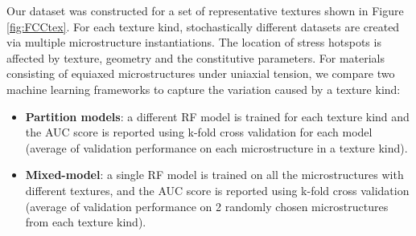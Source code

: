 \documentclass[preprint,1p,times,authoryear]{elsarticle}%
\begin{document}
Our dataset was constructed for a set of representative textures shown in Figure \ref{fig:FCCtex}. For each texture kind, stochastically different datasets are created via multiple microstructure instantiations. The location of stress hotspots is affected by texture, geometry and the constitutive parameters. For materials consisting of equiaxed microstructures under uniaxial tension, we compare two machine learning frameworks to capture the variation caused by a texture kind:
\begin{itemize}
    \item \textbf{Partition models}: a different RF model is trained for each texture kind and the AUC score is reported using k-fold cross validation for each model (average of validation performance on each microstructure in a texture kind).
    \item \textbf{Mixed-model}: a single RF model is trained on all the microstructures with different textures, and the AUC score is reported using k-fold cross validation (average of validation performance on 2 randomly chosen microstructures from each texture kind).
\end{itemize}
\end{document}
